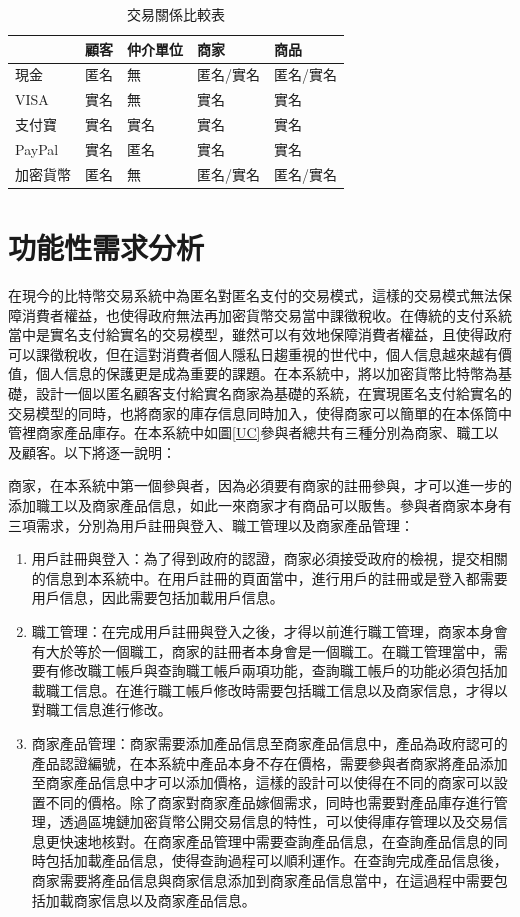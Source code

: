 		\begin{table}[!htbp]
		\centering
		\caption{交易關係比較表}
		\label{txvs}
		\begin{tabular}{|l|l|l|l|l|}
		\hline
		 & 顧客 & 仲介單位 & 商家 & 商品 \\ \hline
		現金 & 匿名 & 無 & 匿名/實名 & 匿名/實名 \\ \hline
		VISA & 實名 & 無 & 實名 & 實名 \\ \hline
		支付寶 & 實名 & 實名 & 實名 & 實名 \\ \hline
		PayPal & 實名 & 匿名 & 實名 & 實名 \\ \hline
		加密貨幣 & 匿名 & 無 & 匿名/實名 & 匿名/實名 \\ \hline
		\end{tabular}
		\end{table}

\section{功能性需求分析}

在現今的比特幣交易系統中為匿名對匿名支付的交易模式，這樣的交易模式無法保障消費者權益，也使得政府無法再加密貨幣交易當中課徵稅收。在傳統的支付系統當中是實名支付給實名的交易模型，雖然可以有效地保障消費者權益，且使得政府可以課徵稅收，但在這對消費者個人隱私日趨重視的世代中，個人信息越來越有價值，個人信息的保護更是成為重要的課題。在本系統中，將以加密貨幣比特幣為基礎，設計一個以匿名顧客支付給實名商家為基礎的系統，在實現匿名支付給實名的交易模型的同時，也將商家的庫存信息同時加入，使得商家可以簡單的在本係筒中管裡商家產品庫存。在本系統中如圖\ref{UC}參與者總共有三種分別為商家、職工以及顧客。以下將逐一說明：

商家，在本系統中第一個參與者，因為必須要有商家的註冊參與，才可以進一步的添加職工以及商家產品信息，如此一來商家才有商品可以販售。參與者商家本身有三項需求，分別為用戶註冊與登入、職工管理以及商家產品管理：

	\begin{enumerate}
	\item 用戶註冊與登入：為了得到政府的認證，商家必須接受政府的檢視，提交相關的信息到本系統中。在用戶註冊的頁面當中，進行用戶的註冊或是登入都需要用戶信息，因此需要包括加載用戶信息。
	\item 職工管理：在完成用戶註冊與登入之後，才得以前進行職工管理，商家本身會有大於等於一個職工，商家的註冊者本身會是一個職工。在職工管理當中，需要有修改職工帳戶與查詢職工帳戶兩項功能，查詢職工帳戶的功能必須包括加載職工信息。在進行職工帳戶修改時需要包括職工信息以及商家信息，才得以對職工信息進行修改。
	\item 商家產品管理：商家需要添加產品信息至商家產品信息中，產品為政府認可的產品認證編號，在本系統中產品本身不存在價格，需要參與者商家將產品添加至商家產品信息中才可以添加價格，這樣的設計可以使得在不同的商家可以設置不同的價格。除了商家對商家產品嫁個需求，同時也需要對產品庫存進行管理，透過區塊鏈加密貨幣公開交易信息的特性，可以使得庫存管理以及交易信息更快速地核對。在商家產品管理中需要查詢產品信息，在查詢產品信息的同時包括加載產品信息，使得查詢過程可以順利運作。在查詢完成產品信息後，商家需要將產品信息與商家信息添加到商家產品信息當中，在這過程中需要包括加載商家信息以及商家產品信息。

	\end{enumerate}

